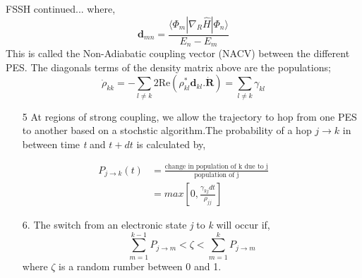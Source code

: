 \documentclass{beamer}
\begin{document}
	\begin{frame}[t]{FSSH continued...}
	where,
	\begin{equation}
	\textbf{d}_{mn} = \frac{\langle\Phi_m|\nabla_R\hat{H}|\Phi_n\rangle}{E_n-E_m}
	\end{equation}
	This is called the Non-Adiabatic coupling vector (NACV) between the different PES.
	The diagonals terms of the density matrix above are the populations;
	\begin{equation}
	\dot{\rho}_{kk} = -\sum_{l \neq k}2\text{Re}(\rho_{kl}^*\textbf{d}_{kl}\textbf{.}\dot{\textbf{R}}) = \sum_{l\neq k}\gamma_{kl}
	\end{equation}
	\begin{enumerate}
	\item[5]{At regions of strong coupling, we allow the trajectory to hop from one PES to another based on a stochstic algorithm.The probability of a hop $j\rightarrow k$ in between time \textit{t} and $t+dt$ is calculated by,
	}
	\end{enumerate} 
	\end{frame}
	
	\begin{frame}[t]{}
	\begin{equation}
	\begin{split}
P_{j\rightarrow k}(t) &= \frac{\text{change in population of k due to j}}{\text{population of j}}\\
&= max\left[0,\frac{\gamma_{kj}dt}{\rho_{jj}}\right]
\end{split}
	\end{equation}
	\begin{enumerate}
	\item[6.]{The switch from an electronic state \textit{j} to \textit{k} will occur if,
\begin{equation}
\sum_{m=1}^{k-1}P_{j\rightarrow m} < \zeta <  \sum_{m=1}^{k}P_{j\rightarrow m}
\end{equation}
where $\zeta$ is a random rumber between 0 and 1.}
	\end{enumerate}
	\end{frame}
	
\end{document}
